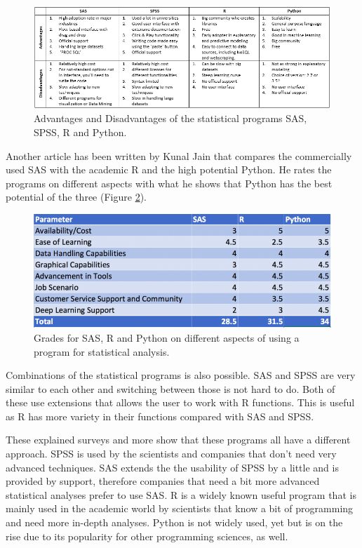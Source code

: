 \documentclass[10pt,a4paper]{article}
\begin{document}
	\begin{figure}[h!]
		\includegraphics[width=\textwidth]{StatProgComp.PNG}
		\caption{Advantages and Disadvantages of the statistical programs SAS, 
		SPSS, R and Python.\cite{BlogKromme2017}}
		\label{fig:StatProgComp}
	\end{figure}
	
	 Another article has been written by Kunal Jain that compares the 
	 commercially used SAS with the academic R and the high potential Python. 
	 He rates the programs on different aspects with what he shows that Python 
	 has the best potential of the three (Figure 
	 \ref{fig:StatProgGrades}).\cite{BlogJain2017}
	
	\begin{figure}[h!]
		\includegraphics[width=\textwidth]{StatProgGrades.PNG}
		\caption{Grades for SAS, R and Python on different aspects of using a 
		program for statistical analysis.\cite{BlogJain2017}}
		\label{fig:StatProgGrades}
	\end{figure}
	
	Combinations of the statistical programs is also possible. SAS and SPSS are 
	very similar to each other and switching between those is 
	not hard to do. Both of these use extensions that allows the user to work 
	with R functions. This is useful as R has more variety in their functions 
	compared with SAS and SPSS.
	\cite{muenchen2011r}
	
	These explained surveys and more \cite{BlogWillems2014} 
	\cite{BlogSupport2017} show that these programs all have a different 
	approach. SPSS is used by the scientists and companies that don't need very 
	advanced techniques. SAS extends the the usability of SPSS by a little and 
	is provided by support, therefore companies that need a bit more advanced 
	statistical analyses prefer to use SAS. R is a widely known useful program 
	that is mainly used in the academic world by scientists that know a bit of 
	programming and need more in-depth analyses. Python is not widely used, yet 
	but is on the rise due to its popularity for other programming sciences, as 
	well.
	
\end{document}
